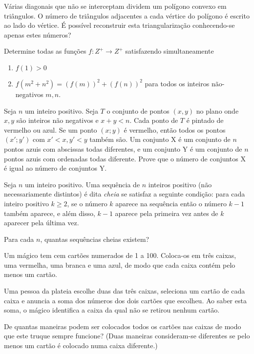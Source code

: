 \begin{questao}
  Várias diagonais que não se interceptam dividem um polígono convexo em
  triângulos. O número de triângulos adjacentes a cada vértice do polígono é
  escrito ao lado do vértice. É possível reconstruir esta triangularização
  conhecendo-se apenas estes números?
\end{questao}

\begin{questao}
  Determine todas as funções $f: Z^+ \rightarrow Z^+$ satisfazendo
  simultaneamente

  \begin{enumerate}

  \item $f(1)>0$

  \item $f(m^2+n^2) = (f(m))^2 + (f(n))^2$ para todos os inteiros não-negativos
    $m,n$.
  \end{enumerate}
\end{questao}

\begin{questao}
  Seja $n$ um inteiro positivo. Seja $T$ o conjunto de pontos $(x,y)$ no plano
  onde $x,y$ são inteiros não negativos e $x+y<n$. Cada ponto de $T$ é pintado
  de vermelho ou azul. Se um ponto $(x;y)$ é vermelho, então todos os pontos
  $(x';y')$ com $x'<x,y'<y$ também são. Um conjunto X é um conjunto de $n$
  pontos azuis com abscissas todas diferentes, e um conjunto Y é um conjunto de
  $n$ pontos azuis com ordenadas todas diferente.  Prove que o número de
  conjuntos X é igual ao número de conjuntos Y.
\end{questao}

\begin{questao}
  Seja $n$ um inteiro positivo. Uma sequência de $n$ inteiros positivo (não
  necessariamente distintos) é dita {\it cheia} se satisfaz a seguinte condição:
  para cada inteiro positivo $k \geq 2$, se o número $k$ aparece na sequência
  então o número $k-1$ também aparece, e além disso, $k-1$ aparece pela primeira
  vez antes de $k$ aparecer pela última vez.

  Para cada $n$, quantas sequências cheias existem?
\end{questao}

\begin{questao}
  Um mágico tem cem cartões numerados de 1 a 100. Coloca-os em três caixas, uma
  vermelha, uma branca e uma azul, de modo que cada caixa contém pelo menos um
  cartão.

  Uma pessoa da plateia escolhe duas das três caixas, seleciona um cartão de
  cada caixa e anuncia a soma dos números dos dois cartões que escolheu. Ao
  saber esta soma, o mágico identifica a caixa da qual não se retirou nenhum
  cartão.

  De quantas maneiras podem ser colocados todos os cartões nas caixas de modo
  que este truque sempre funcione? (Duas maneiras consideram-se diferentes se
  pelo menos um cartão é colocado numa caixa diferente.)
\end{questao}

